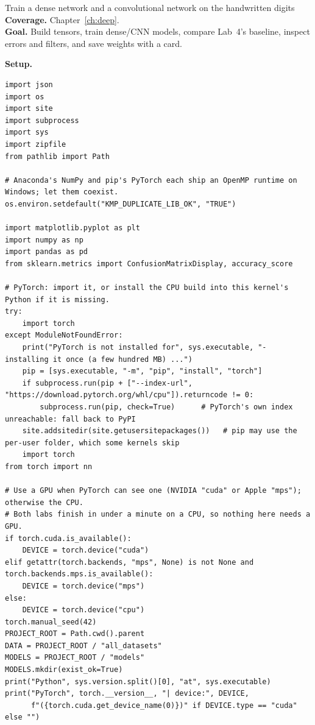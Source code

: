
\begin{labproject}{Train a dense network and a convolutional network on the handwritten digits}
\textbf{Coverage.} Chapter~\ref{ch:deep}.\\
\textbf{Goal.} Build tensors, train dense/CNN models, compare Lab~4's baseline, inspect errors and filters, and save weights with a card.

\medskip\noindent\textbf{Setup.}\par
\begin{lstlisting}[style=utppython]
import json
import os
import site
import subprocess
import sys
import zipfile
from pathlib import Path

# Anaconda's NumPy and pip's PyTorch each ship an OpenMP runtime on Windows; let them coexist.
os.environ.setdefault("KMP_DUPLICATE_LIB_OK", "TRUE")

import matplotlib.pyplot as plt
import numpy as np
import pandas as pd
from sklearn.metrics import ConfusionMatrixDisplay, accuracy_score

# PyTorch: import it, or install the CPU build into this kernel's Python if it is missing.
try:
    import torch
except ModuleNotFoundError:
    print("PyTorch is not installed for", sys.executable, "- installing it once (a few hundred MB) ...")
    pip = [sys.executable, "-m", "pip", "install", "torch"]
    if subprocess.run(pip + ["--index-url", "https://download.pytorch.org/whl/cpu"]).returncode != 0:
        subprocess.run(pip, check=True)      # PyTorch's own index unreachable: fall back to PyPI
    site.addsitedir(site.getusersitepackages())   # pip may use the per-user folder, which some kernels skip
    import torch
from torch import nn

# Use a GPU when PyTorch can see one (NVIDIA "cuda" or Apple "mps"); otherwise the CPU.
# Both labs finish in under a minute on a CPU, so nothing here needs a GPU.
if torch.cuda.is_available():
    DEVICE = torch.device("cuda")
elif getattr(torch.backends, "mps", None) is not None and torch.backends.mps.is_available():
    DEVICE = torch.device("mps")
else:
    DEVICE = torch.device("cpu")
torch.manual_seed(42)
PROJECT_ROOT = Path.cwd().parent
DATA = PROJECT_ROOT / "all_datasets"
MODELS = PROJECT_ROOT / "models"
MODELS.mkdir(exist_ok=True)
print("Python", sys.version.split()[0], "at", sys.executable)
print("PyTorch", torch.__version__, "| device:", DEVICE,
      f"({torch.cuda.get_device_name(0)})" if DEVICE.type == "cuda" else "")
\end{lstlisting}


\end{labproject}
